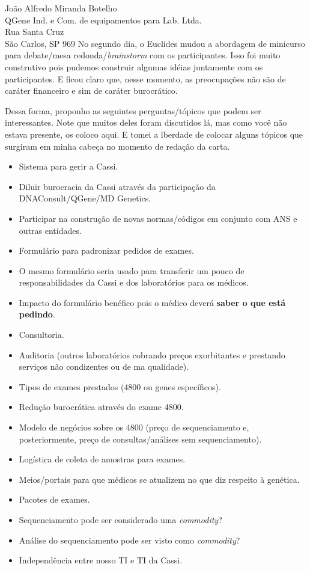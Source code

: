 \documentclass{letter}
\begin{document}
\begin{letter}{João Alfredo Miranda Botelho \\ QGene Ind. e Com. de equipamentos para Lab. Ltda. \\ Rua Santa Cruz \\ São Carlos, SP 969}
No segundo dia, o Euclides mudou a abordagem de minicurso para debate/mesa redonda/\textit{brainstorm} com os participantes. Isso foi muito construtivo pois pudemos
construir algumas idéias juntamente com os participantes. E ficou claro que, nesse momento, as preocupações não são de caráter financeiro e sim de caráter
burocrático. 
 
Dessa forma, proponho as seguintes perguntas/tópicos que podem ser interessantes. Note que muitos deles foram discutidos lá, mas como você não estava presente,
os coloco aqui. E tomei a lberdade de colocar alguns tópicos que surgiram em minha cabeça no momento de redação da carta.
\begin{itemize}
\item Sistema para gerir a Cassi.
\item Diluir burocracia da Cassi através da participação da DNAConsult/QGene/MD Genetics.
\item Participar na construção de novas normas/códigos em conjunto com ANS e outras entidades.
\item Formulário para padronizar pedidos de exames.
\item O mesmo formulário seria usado para transferir um pouco de responsabilidades da Cassi e dos laboratórios para os médicos.
\item Impacto do formulário benéfico pois o médico deverá \textbf{saber o que está pedindo}.
\item Consultoria.
\item Auditoria (outros laboratórios cobrando preços exorbitantes e prestando serviços não condizentes ou de ma qualidade).
\item Tipos de exames prestados (4800 ou genes específicos).
\item Redução burocrática através do exame 4800.
\item Modelo de negócios sobre os 4800 (preço de sequenciamento e, posteriormente, preço de consultas/análises sem sequenciamento).
\item Logística de coleta de amostras para exames.
\item Meios/portais para que médicos se atualizem no que diz respeito à genética.
\item Pacotes de exames.
\item Sequenciamento pode ser considerado uma \textit{commodity}?
\item Análise do sequenciamento pode ser visto como \textit{commodity}?
\item Independência entre nosso TI e TI da Cassi.
\end{itemize}


\end{letter}
\end{document}
